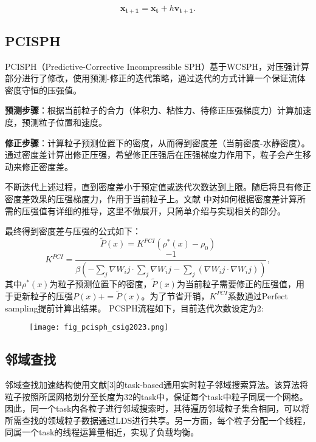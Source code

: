 \begin{equation}
	\boldsymbol{x_{t+1}}=\boldsymbol{x_{t}}+h\boldsymbol{v_{t+1}}.
\end{equation}

\subsection{PCISPH}
PCISPH（Predictive-Corrective Incompressible SPH）基于WCSPH，对压强计算部分进行了修改，使用预测-修正的迭代策略，通过迭代的方式计算一个保证流体密度守恒的压强值。

\textbf{预测步骤}：根据当前粒子的合力（体积力、粘性力、待修正压强梯度力）计算加速度，预测粒子位置和速度。

\textbf{修正步骤}：计算粒子预测位置下的密度，从而得到密度差（当前密度-水静密度）。通过密度差计算出修正压强，希望修正压强后在压强梯度力作用下，粒子会产生移动来修正密度差。

不断迭代上述过程，直到密度差小于预定值或迭代次数达到上限。随后将具有修正密度差效果的压强梯度力，作用于当前粒子上。文献 \cite{solenthaler2009predictive} 中对如何根据密度差计算所需的压强值有详细的推导，这里不做展开，只简单介绍与实现相关的部分。

最终得到密度差与压强的公式如下：
\begin{equation}
	\widetilde{P}(x)=K^{PCI}(\rho^*(x)-\rho_0)
\end{equation}
\begin{equation}
	K^{PCI}=\frac{-1}{\beta(-\sum_j\nabla W_ij\cdot\sum_j\nabla W_ij-\sum_j(\nabla W_ij \cdot \nabla W_ij))},
\end{equation}
其中$\rho^*(x)$为粒子预测位置下的密度，$\widetilde{P}(x)$为当前粒子需要修正的压强值，用于更新粒子的压强$P(x)+=\widetilde{P}(x)$。为了节省开销，$K^{PCI}$系数通过Perfect sampling提前计算出结果。
PCSPH流程如下，目前迭代次数设定为2:

\begin{figure}[H]
	\centering
	\texttt{[image: fig\_pcisph\_csig2023.png]}
\end{figure}

\subsection{邻域查找}
邻域查找加速结构使用文献[3]的task-based通用实时粒子邻域搜索算法。该算法将粒子按照所属网格划分至长度为32的task中，保证每个task中粒子同属一个网格。因此，同一个task内各粒子进行邻域搜索时，其待遍历邻域粒子集合相同，可以将所需查找的领域粒子数据通过LDS进行共享。另一方面，每个粒子分配一个线程，同属一个task的线程运算量相近，实现了负载均衡。

